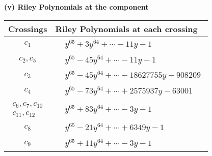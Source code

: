 \documentclass[1p]{elsarticle_modified}
\theoremstyle{definition}
\begin{document}
\newpage\renewcommand{\arraystretch}{1}
\flushleft \textbf{(v) Riley Polynomials at the component}\newline \\
\begin{tabular}{m{50pt}|m{274pt}}
Crossings & \hspace{64pt}Riley Polynomials at each crossing \\
\hline $$\begin{aligned}c_{1}\end{aligned}$$&$\begin{aligned}
&y^{65}+3 y^{64}+\cdots-11 y-1
\end{aligned}$\\
\hline $$\begin{aligned}c_{2},c_{5}\end{aligned}$$&$\begin{aligned}
&y^{65}-45 y^{64}+\cdots-11 y-1
\end{aligned}$\\
\hline $$\begin{aligned}c_{3}\end{aligned}$$&$\begin{aligned}
&y^{65}-45 y^{64}+\cdots-18627755 y-908209
\end{aligned}$\\
\hline $$\begin{aligned}c_{4}\end{aligned}$$&$\begin{aligned}
&y^{65}-73 y^{64}+\cdots+2575937 y-63001
\end{aligned}$\\
\hline $$\begin{aligned}c_{6},c_{7},c_{10}\\c_{11},c_{12}\end{aligned}$$&$\begin{aligned}
&y^{65}+83 y^{64}+\cdots-3 y-1
\end{aligned}$\\
\hline $$\begin{aligned}c_{8}\end{aligned}$$&$\begin{aligned}
&y^{65}-21 y^{64}+\cdots+6349 y-1
\end{aligned}$\\
\hline $$\begin{aligned}c_{9}\end{aligned}$$&$\begin{aligned}
&y^{65}+11 y^{64}+\cdots-3 y-1
\end{aligned}$\\
\hline
\end{tabular}\\~\\
\end{document}
